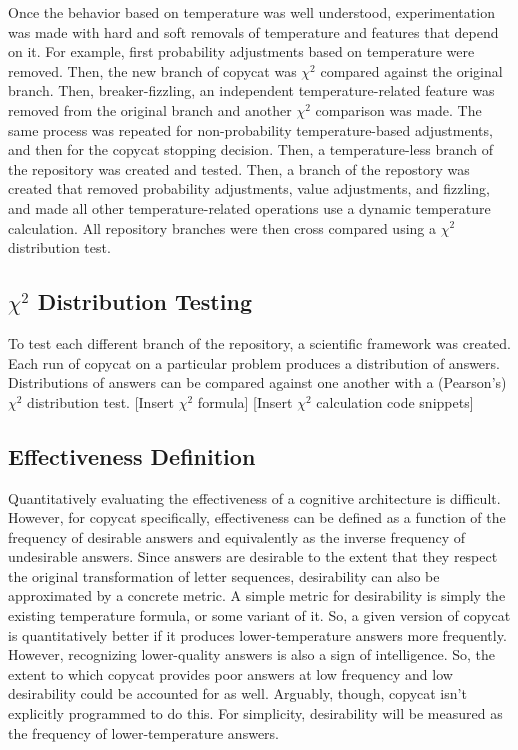\documentclass[a4paper]{article}
\begin{document}
        Once the behavior based on temperature was well understood, experimentation was made with hard and soft removals of temperature and features that depend on it.
        For example, first probability adjustments based on temperature were removed.
        Then, the new branch of copycat was $\chi^2$ compared against the original branch.
        Then, breaker-fizzling, an independent temperature-related feature was removed from the original branch and another $\chi^2$ comparison was made.
        The same process was repeated for non-probability temperature-based adjustments, and then for the copycat stopping decision.
        Then, a temperature-less branch of the repository was created and tested.
        Then, a branch of the repostory was created that removed probability adjustments, value adjustments, and fizzling, and made all other temperature-related operations use a dynamic temperature calculation.
        All repository branches were then cross compared using a $\chi^2$ distribution test.

    \subsection{$\chi^2$ Distribution Testing}

        To test each different branch of the repository, a scientific framework was created.
        Each run of copycat on a particular problem produces a distribution of answers.
        Distributions of answers can be compared against one another with a (Pearson's) $\chi^2$ distribution test.
        [Insert $\chi^2$ formula]
        [Insert $\chi^2$ calculation code snippets]

    \subsection{Effectiveness Definition}

        Quantitatively evaluating the effectiveness of a cognitive architecture is difficult.
        However, for copycat specifically, effectiveness can be defined as a function of the frequency of desirable answers and equivalently as the inverse frequency of undesirable answers.
        Since answers are desirable to the extent that they respect the original transformation of letter sequences, desirability can also be approximated by a concrete metric.
        A simple metric for desirability is simply the existing temperature formula, or some variant of it.
        So, a given version of copycat is quantitatively better if it produces lower-temperature answers more frequently.
        However, recognizing lower-quality answers is also a sign of intelligence.
        So, the extent to which copycat provides poor answers at low frequency and low desirability could be accounted for as well.
        Arguably, though, copycat isn't explicitly programmed to do this.
        For simplicity, desirability will be measured as the frequency of lower-temperature answers.
\end{document}
